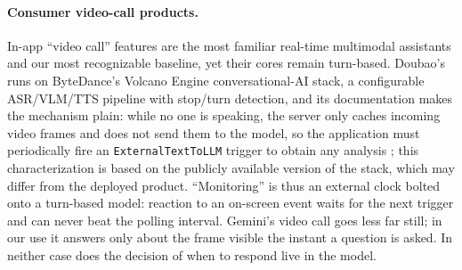 \documentclass{llmxive}
\begin{document}
\paragraph{\textbf{Consumer video-call products.}} In-app ``video call'' features are the most familiar real-time multimodal assistants and our most recognizable baseline, yet their cores remain turn-based. Doubao's runs on ByteDance's Volcano Engine conversational-AI stack, a configurable ASR/VLM/TTS pipeline with stop/turn detection, and its documentation makes the mechanism plain: while no one is speaking, the server only caches incoming video frames and does not send them to the model, so the application must periodically fire an \texttt{ExternalTextToLLM} trigger to obtain any analysis \cite{volcengine2026videounderstanding}; this characterization is based on the publicly available version of the stack, which may differ from the deployed product. ``Monitoring'' is thus an external clock bolted onto a turn-based model: reaction to an on-screen event waits for the next trigger and can never beat the polling interval. Gemini's video call goes less far still; in our use it answers only about the frame visible the instant a question is asked. In neither case does the decision of when to respond live in the model.


\end{document}

